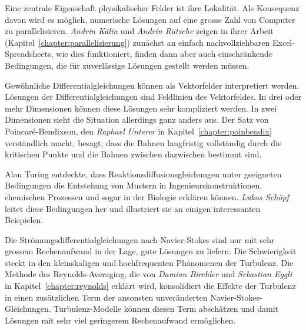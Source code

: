 Eine zentrale Eigenschaft physikalischer Felder ist ihre Lokalität.
%
Als Konsequenz davon wird es möglich, numerische Lösungen auf eine
grosse Zahl von Computer zu parallelisieren.
%
\emph{Andrin Kälin}
%
%
und
\emph{Andrin Rütsche}
%
%
zeigen in ihrer Arbeit (Kapitel~\ref{chapter:parallelisierung})
zunächst an einfach nachvollziehbaren Excel-Spreadsheets, wie dies
%
%
funktioniert, finden dann aber auch einschränkende Bedingungen,
die für zuverlässige Lösungen gestellt werden müssen.

Gewöhnliche Differentialgleichungen können als Vektorfelder interpretiert
werden.
Lösungen der Differentialgleichungen sind Feldlinien des Vektorfeldes.
In drei oder mehr Dimensionen können diese Lösungen sehr kompliziert
werden.
In zwei Dimensionen sieht die Situation allerdings ganz anders aus.
Der Satz von Poincaré-Bendixson, den 
%
\emph{Raphael Unterer}
%
%
in Kapitel~\ref{chapter:poinbendix} verständlich macht, besagt, dass
die Bahnen langfristig vollständig durch die kritischen Punkte
%
und die Bahnen zwischen dazwischen bestimmt sind.

Alan Turing
%
entdeckte, dass Reaktionsdiffusionsgleichungen unter geeigneten
Bedingungen die Entstehung von Mustern in Ingenieurskonstruktionen,
chemischen Prozessen und sogar in der Biologie erklären können.
\emph{Lukas Schöpf}
%
%
leitet diese Bedingungen her und illustriert sie an einigen interessanten
Beispielen.

Die Strömungsdifferentialgleichungen nach Navier-Stokes sind nur
%
mit sehr grossem Rechenaufwand in der Lage, gute Lösungen zu liefern.
Die Schwierigkeit steckt in den kleinskaligen und hochfrequenten 
Phänomenen der Turbulenz.
Die Methode des Reynolds-Averaging, die von
\emph{Damian Birchler}
%
%
und
\emph{Sebastian Eggli}
%
%
in Kapitel~\ref{chapter:reynolds} erklärt wird, konsolidiert die Effekte
der Turbulenz in einen zusätzlichen Term der ansonsten unveränderten
Navier-Stokes-Gleichungen.
Turbulenz-Modelle können diesen Term abschätzen und damit Lösungen mit
%
sehr viel geringerem Rechenaufwand ermöglichen.

